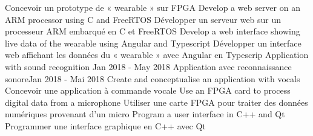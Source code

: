 \documentclass[letterpaper,11pt]{resume}
\begin{document}
                {Concevoir un prototype de « wearable » sur FPGA}
            \resumeItemEnFr
                {Develop a web server on an ARM processor using C and FreeRTOS}
                {Développer un serveur web sur un processeur ARM embarqué en C et FreeRTOS}
            \resumeItemEnFr
                {Develop a web interface showing live data of the wearable using Angular and Typescript}
                {Développer un interface web affichant les données du « wearable » avec Angular en Typescrip}
          \resumeItemListEnd
      \resumeProjectHeadingEnFr
          {Application with sound recognition }{Jan 2018 - May 2018}
          {Application avec reconnaissance sonore}{Jan 2018 - Mai 2018}
          \resumeItemListStart
            \resumeItemEnFr
                {Create and conceptualise an application with vocals}
                {Concevoir une application à commande vocale}
            \resumeItemEnFr
                {Use an FPGA card to process digital data from a microphone}
                {Utiliser une carte FPGA pour traiter des données numériques provenant d’un micro}
            \resumeItemEnFr
                {Program a user interface in C++ and Qt}
                {Programmer une interface graphique en C++ avec Qt}
          \resumeItemListEnd
    \resumeSubHeadingListEnd
\end{document}
